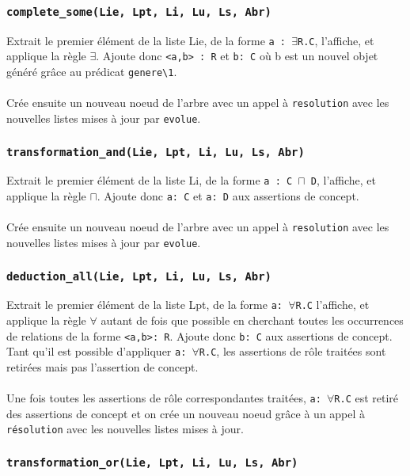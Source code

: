 \documentclass{article}
\newcommand{\code}[1]{\colorbox{light-gray}{\texttt{#1}}}
\begin{document}
\subsubsection{\code{complete\_some(Lie, Lpt, Li, Lu, Ls, Abr)}}

Extrait le premier élément de la liste Lie, de la forme \code{a : $\exists$R.C}, l'affiche, et applique la règle $\exists$. Ajoute donc \code{<a,b> : R} et \code{b: C} où b est un nouvel objet généré grâce au prédicat \code{genere\textbackslash1}.
\\\\
Crée ensuite un nouveau noeud de l'arbre avec un appel à \code{resolution} avec les nouvelles listes mises à jour par \code{evolue}.

\subsubsection{\code{transformation\_and(Lie, Lpt, Li, Lu, Ls, Abr)}}

Extrait le premier élément de la liste Li, de la forme \code{a : C $\sqcap$ D}, l'affiche, et applique la règle $\sqcap$. Ajoute donc \code{a: C} et \code{a: D} aux assertions de concept.
\\\\
Crée ensuite un nouveau noeud de l'arbre avec un appel à \code{resolution} avec les nouvelles listes mises à jour par \code{evolue}.

\subsubsection{\code{deduction\_all(Lie, Lpt, Li, Lu, Ls, Abr)}}

Extrait le premier élément de la liste Lpt, de la forme \code{a: $\forall$R.C} l'affiche, et applique la règle $\forall$ autant de fois que possible en cherchant toutes les occurrences de relations de la forme \code{<a,b>: R}. Ajoute donc \code{b: C} aux assertions de concept. Tant qu'il est possible d'appliquer  \code{a: $\forall$R.C}, les assertions de rôle traitées sont retirées mais pas l'assertion de concept.
\\\\
Une fois toutes les assertions de rôle correspondantes traitées, \code{a: $\forall$R.C} est retiré des assertions de concept et on crée un nouveau noeud grâce à un appel à \code{résolution} avec les nouvelles listes mises à jour.

\subsubsection{\code{transformation\_or(Lie, Lpt, Li, Lu, Ls, Abr)}}
\end{document}
